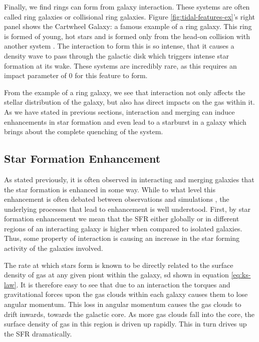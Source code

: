Finally, we find rings can form from galaxy interaction. These systems are often called ring galaxies or collisional ring galaxies. Figure \ref{fig:tidal-features-ex}'s right panel shows the Cartwheel Galaxy: a famous example of a ring galaxy. This ring is formed of young, hot stars and is formed only from the head-on collision with another system \citep{1976ApJ...209..382L}. The interaction to form this is so intense, that it causes a density wave to pass through the galactic disk which triggers intense star formation at its wake. These systems are incredibly rare, as this requires an impact parameter of 0 for this feature to form.

From the example of a ring galaxy, we see that interaction not only affects the stellar distribution of the galaxy, but also has direct impacts on the gas within it. As we have stated in previous sections, interaction and merging can induce enhancements in star formation and even lead to a starburst in a galaxy which brings about the complete quenching of the system.

\subsection{Star Formation Enhancement} 
\noindent As stated previously, it is often observed in interacting and merging galaxies that the star formation is enhanced in some way. While to what level this enhancement is often debated between observations \citep{2003ApJ...582..668B, 2008MNRAS.385.1903L, 2011MNRAS.412..591P, 2022ApJS..261...34H} and simulations \citep{2007A&A...468...61D, 2008MNRAS.384..386C, 2013MNRAS.430.1901H, 2021MNRAS.503.3113M}, the underlying processes that lead to enhancement is well understood. First, by star formation enhancement we mean that the SFR either globally or in different regions of an interacting galaxy is higher when compared to isolated galaxies. Thus, some property of interaction is causing an increase in the star forming activity of the galaxies involved. 

The rate at which stars form is known to be directly related to the surface density of gas at any given piont within the galaxy, sd shown in equation \ref{eq:ks-law}. It is therefore easy to see that due to an interaction the torques and gravitational forces upon the gas clouds within each galaxy causes them to lose angular momentum. This loss in angular momentum causes the gas clouds to drift inwards, towards the galactic core. As more gas clouds fall into the core, the surface density of gas in this region is driven up rapidly. This in turn drives up the SFR dramatically.

